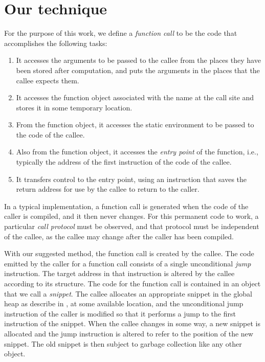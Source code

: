 \section{Our technique}
\label{sec-our-technique}

For the purpose of this work, we define a \emph{function call} to be
the code that accomplishes the following tasks:

\begin{enumerate}
\item It accesses the arguments to be passed to the callee from the
  places they have been stored after computation, and puts the
  arguments in the places that the callee expects them.
\item It accesses the function object associated with the name at the
  call site and stores it in some temporary location.
\item From the function object, it accesses the static environment to
  be passed to the code of the callee.
\item Also from the function object, it accesses the \emph{entry
  point} of the function, i.e., typically the address of the first
  instruction of the code of the callee.
\item It transfers control to the entry point, using an instruction
  that saves the return address for use by the callee to return to the
  caller.
\end{enumerate}

In a typical implementation, a function call is generated when the
code of the caller is compiled, and it then never changes.  For this
permanent code to work, a particular \emph{call protocol} must be
observed, and that protocol must be independent of the callee, as the
callee may change after the caller has been compiled.

With our suggested method, the function call is created by the
callee.  The code emitted by the caller for a function call consists
of a single unconditional \emph{jump} instruction.  The target address
in that instruction is altered by the callee according to its
structure.  The code for the function call is contained in an object
that we call a \emph{snippet}.  The callee allocates an appropriate
snippet in the global heap as describe in ,
at some available location, and the unconditional jump instruction of
the caller is modified so that it performs a jump to the first
instruction of the snippet.  When the callee changes in some way, a
new snippet is allocated and the jump instruction is altered to refer
to the position of the new snippet.  The old snippet is then subject
to garbage collection like any other object.

